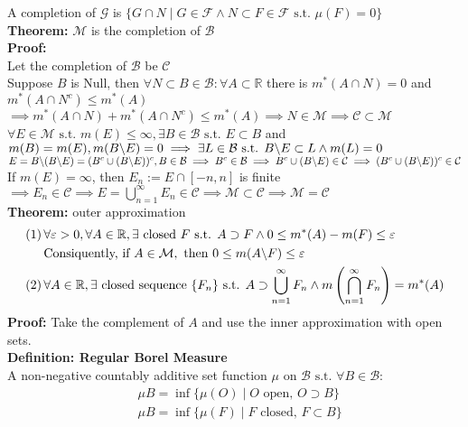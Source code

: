 \documentclass{article}
\newcommand{\R}{\mathbb{R}}
\newcommand{\infcap}{\bigcap\limits_{n=1}^\infty}
\newcommand{\infcup}{\bigcup\limits_{n=1}^\infty}
\newcommand{\cupninf}{\bigcup\limits_{n=1}^\infty}
\newcommand{\bcsl}{\symbol{92}}
\newcommand{\st}{\mbox{ s.t. }}
\newcommand{\0}{{\bf{0}}}
\newcommand{\1}{{\bf{1}}}
\begin{document}
A completion of $\mathcal{G}$ is $\{G\cap N\mid G\in\mathcal{F}\land N\subset F\in\mathcal{F}\st \mu(F)=0\}$\\
\textbf{Theorem:} $\mathcal{M}$ is the completion of $\mathcal{B}$\\
\textbf{Proof:}\\
Let the completion of $\mathcal{B}$ be $\mathcal{C}$\\
Suppose $B$ is Null, then $\forall N\subset B\in\mathcal{B}:\forall A\subset\R$ there is $m^*(A\cap N)=0$ and $m^*(A\cap N^c)\le m^*(A)$\\
$\implies m^*(A\cap N)+m^*(A\cap N^c)\le m^*(A)\implies N\in\mathcal{M}\implies\mathcal{C}\subset\mathcal{M}$\\
$\forall E\in\mathcal{M}\st m(E)\le\infty,\exists B\in\mathcal{B}\st E\subset B$ and $m(B)=m(E),m(B\bcsl E)=0\implies\exists L\in\mathcal{B}\st B\bcsl E\subset L\land m(L)=0$\\
$E=B\bcsl(B\bcsl E)=(B^c\cup(B\bcsl E))^c,B\in\mathcal{B}\implies B^c\in\mathcal{B}\implies B^c\cup(B\bcsl E)\in\mathcal{C}\implies (B^c\cup(B\bcsl E))^c\in\mathcal{C}$\\
If $m(E)=\infty$, then $E_n:=E\cap[-n,n]$ is finite$\implies E_n\in\mathcal{C}\implies E=\cupninf E_n\in\mathcal{C}\implies\mathcal{M}\subset\mathcal{C}\implies\mathcal{M}=\mathcal{C}$\\
\textbf{Theorem:} outer approximation
\begin{equation}
\begin{split}
    (1)\,&\forall\varepsilon>0,\forall A\in\R,\exists\mbox{ closed }F\st A\supset F\land0\le m^*(A)-m(F)\le\varepsilon\\
    &\mbox{Consiquently, if }A\in\mathcal{M},\mbox{ then }0\le m(A\bcsl F)\le\varepsilon\\
    (2)\,&\forall A\in\R,\exists\mbox{ closed sequence }\{F_n\}\st A\supset\infcup F_n\land m\left(\infcap F_n\right)=m^*(A)
\end{split}
\end{equation}
\textbf{Proof:} Take the complement of $A$ and use the inner approximation with open sets.\\
\textbf{Definition: Regular Borel Measure}\\
A non-negative countably additive set function $\mu$ on $\mathcal{B}\st\forall B\in\mathcal{B}:$
\begin{equation}
\begin{split}
    &\mu{B}=\inf\{\mu(O)\mid O\mbox{ open, }O\supset B\}\\
    &\mu{B}=\inf\{\mu(F)\mid F\mbox{ closed, }F\subset B\}
\end{split}
\end{equation}
\end{document}
